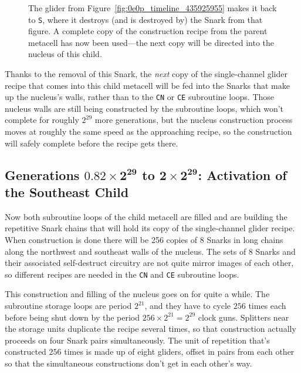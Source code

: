 \begin{figure}[!htb]
	\centering
	\caption{The glider from Figure~\ref{fig:0e0p_timeline_435925955} makes it back to \texttt{S}, where it destroys (and is destroyed by) the Snark from that figure. A complete copy of the construction recipe from the parent metacell has now been used---the next copy will be directed into the nucleus of this child.}
	\label{fig:0e0p_timeline_438935522}
\end{figure}

Thanks to the removal of this Snark, the \emph{next} copy of the single-channel glider recipe that comes into this child metacell will be fed into the Snarks that make up the nucleus's walls, rather than to the \texttt{CN} or \texttt{CE} subroutine loops. Those nucleus walls are still being constructed by the subroutine loops, which won't complete for roughly $2^{29}$ more generations, but the nucleus construction process moves at roughly the same speed as the approaching recipe, so the construction will safely complete before the recipe gets there.


\subsection{Generations $\mathbf{0.82 \times 2^{29}}$ to $\mathbf{2 \times 2^{29}}$: Activation of the Southeast Child}\label{sec:0e0p_timeline_nucleus_fill}

Now both subroutine loops of the child metacell are filled and are building the repetitive Snark chains that will hold its copy of the single-channel glider recipe. When construction is done there will be 256 copies of 8 Snarks in long chains along the northwest and southeast walls of the nucleus. The sets of 8 Snarks and their associated self-destruct circuitry are not quite mirror images of each other, so different recipes are needed in the \texttt{CN} and \texttt{CE} subroutine loops.

This construction and filling of the nucleus goes on for quite a while. The subroutine storage loops are period $2^{21}$, and they have to cycle $256$ times each before being shut down by the period $256 \times 2^{21} = 2^{29}$ clock guns. Splitters near the storage units duplicate the recipe several times, so that construction actually proceeds on four Snark pairs simultaneously. The unit of repetition that's constructed $256$ times is made up of eight gliders, offset in pairs from each other so that the simultaneous constructions don't get in each other's way.

